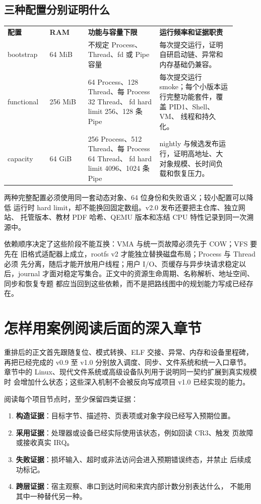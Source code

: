 \subsection*{三种配置分别证明什么}

\begin{longtable}{|L{0.16\linewidth}|L{0.15\linewidth}|L{0.29\linewidth}|L{0.30\linewidth}|}
\hline
{}
\textbf{配置} & \textbf{RAM} & \textbf{功能与容量下限} & \textbf{运行频率和证据职责} \\\tablerowrule
\endhead
bootstrap & 64 MiB & 不规定 Process、Thread、fd 或 Pipe 容量 &
每次提交运行，证明自研启动链、异常和内存基础仍兼容。 \\\tablerowrule
functional & 256 MiB & 64 Process、128 Thread、每 Process 32 Thread、
fd hard limit 256、128 条 Pipe &
每次提交运行 smoke；每个小版本运行完整功能套件，覆盖 PID1、Shell、VM、
线程和持久化。 \\\tablerowrule
capacity & 64 GiB & 256 Process、512 Thread、每 Process 64 Thread、
fd hard limit 4096、1024 条 Pipe &
nightly 与候选发布运行，证明高地址、大对象规模、长时间负载和恢复压力。 \\\hline
\end{longtable}

两种完整配置必须使用同一套动态对象、64 位身份和失败语义；较小配置可以降低
运行时 hard limit，却不能换回固定数组。v2.0 发布还要把主仓库、独立网站、
托管版本、教材 PDF 哈希、QEMU 版本和冻结 CPU 特性记录到同一次溯源中。

依赖顺序决定了这些阶段不能互换：VMA 与统一页故障必须先于 COW；VFS 要先在
旧格式适配器上成立，rootfs v2 才能独立替换磁盘布局；Process 与 Thread 必须
先分离，随后才能开放用户线程；用户 I/O、页缓存与异步块请求稳定以后，journal
才面对稳定写集合。正文中的资源生命周期、名称解析、地址空间、同步和恢复专题
都应当回到这些依赖，而不是把路线图中的规划能力写成已经存在。

\section*{怎样用案例阅读后面的深入章节}

重排后的正文首先跟随复位、模式转换、ELF 交接、异常、内存和设备里程碑，
再把已经完成的 v0.9 至 v1.0 分别放入调度、同步、文件系统和统一入口章节。
章节中的 Linux、现代文件系统或高级设备队列用于说明同一契约扩展到真实规模时
会增加什么状态；这些深入机制不会被反向写成项目 v1.0 已经实现的能力。

阅读每个项目节点时，至少保留四类证据：

\begin{enumerate}
\tightlist
\item \textbf{构造证据}：目标字节、描述符、页表项或对象字段已经写入预期位置。
\item \textbf{采用证据}：处理器或设备已经实际使用该状态，例如回读 CR3、触发
  页故障或接收真实 IRQ。
\item \textbf{失败证据}：损坏输入、超时或非法访问会进入预期错误终态，并禁止
  后续成功标记。
\item \textbf{跨层证据}：宿主观察、串口到达时间和来宾内部计数分别表达什么，
  不能用其中一种替代另一种。
\end{enumerate}

